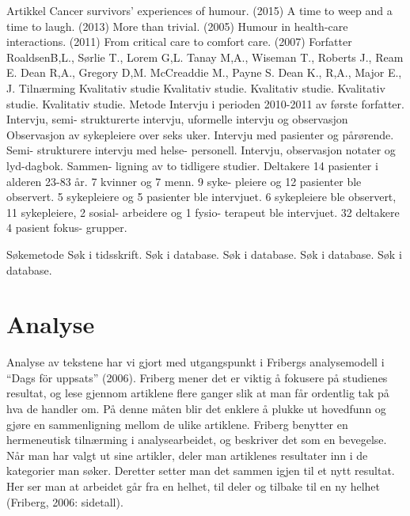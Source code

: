 Artikkel
	Cancer survivors’ experiences of humour.
(2015)
	A time to weep and a time to laugh.
(2013)
	More than trivial.
(2005)
	Humour in health-care
interactions.
(2011)
	From critical care to
comfort care.
(2007)
	Forfatter
	RoaldsenB,L., Sørlie T., Lorem G,L.
	Tanay M,A.,
Wiseman T.,
Roberts J.,
Ream E.
	Dean R,A.,
Gregory D,M.
	McCreaddie M., Payne S.
	Dean K., R,A.,
Major E., J.
	Tilnærming
	Kvalitativ studie
	Kvalitativ studie.
	Kvalitativ studie.
	Kvalitativ studie.
	Kvalitativ studie.
	Metode
	Intervju i perioden 2010-2011 av første forfatter.
	Intervju,
semi-
strukturerte intervju,
uformelle intervju og
observasjon
	Observasjon av sykepleiere over seks uker. Intervju med pasienter og pårørende.
Semi- strukturere intervju med helse- personell.
	Intervju,
observasjon
notater og
lyd-dagbok.
	Sammen-
ligning av to tidligere studier.
	Deltakere
	14 pasienter i alderen 23-83 år.
7 kvinner og 7 menn.
	9 syke-
pleiere og 12 pasienter ble observert.
5 sykepleiere og 5 pasienter ble intervjuet.
	6 sykepleiere
ble observert, 11 sykepleiere,
2 sosial-
arbeidere og 1 fysio-
terapeut
ble intervjuet.
	32 deltakere
4 pasient
fokus-
grupper.

	Søkemetode
	Søk i tidsskrift.
	Søk i database.
	Søk i database.
	Søk i database.
	Søk i database.
	

\section{Analyse}

Analyse av tekstene har vi gjort med utgangspunkt i Fribergs analysemodell i
“Dags för uppsats” (2006). Friberg mener det er viktig å fokusere på studienes
resultat, og lese gjennom artiklene flere ganger slik at man får ordentlig tak
på hva de handler om. På denne måten blir det enklere å plukke ut hovedfunn og
gjøre en sammenligning mellom de ulike artiklene. Friberg benytter en
hermeneutisk tilnærming i analysearbeidet, og beskriver det som en bevegelse.
Når man har valgt ut sine artikler, deler man artiklenes resultater inn i de
kategorier man søker. Deretter setter man det sammen igjen til et nytt
resultat. Her ser man at arbeidet går fra en helhet, til deler og tilbake til
en ny helhet (Friberg, 2006: sidetall).

